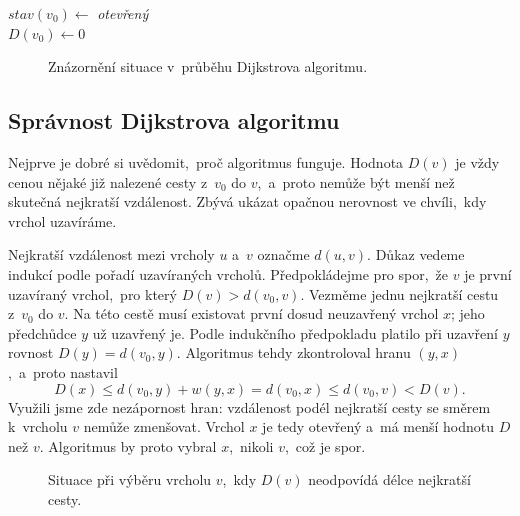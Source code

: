 \begin{algorithm}
    \caption{\textsc{Dijkstra}}
    $stav(v_0)\gets$ \textit{otevřený}\\
    $D(v_0)\gets 0$\\

\end{algorithm}
\begin{figure}[ht]
    \centering
    
    \caption{Znázornění situace v~průběhu Dijkstrova algoritmu.}
    \label{fig:dijkstra_kratsi_cesta}
\end{figure}

\subsection{Správnost Dijkstrova algoritmu}

Nejprve je dobré si uvědomit,~proč algoritmus funguje. Hodnota $D(v)$ je vždy cenou nějaké již nalezené cesty z~$v_0$ do $v$,~a~proto nemůže být menší než skutečná nejkratší vzdálenost. Zbývá ukázat opačnou nerovnost ve chvíli,~kdy vrchol uzavíráme.

Nejkratší vzdálenost mezi vrcholy $u$ a~$v$ označme $d(u,v)$. Důkaz vedeme indukcí podle pořadí uzavíraných vrcholů. Předpokládejme pro spor,~že $v$ je první uzavíraný vrchol,~pro který $D(v)>d(v_0,v)$. Vezměme jednu nejkratší cestu z~$v_0$ do $v$. Na této cestě musí existovat první dosud neuzavřený vrchol $x$; jeho předchůdce $y$ už uzavřený je. Podle indukčního předpokladu platilo při uzavření $y$ rovnost $D(y)=d(v_0,y)$. Algoritmus tehdy zkontroloval hranu $(y,x)$,~a~proto nastavil
\[D(x)\leqslant d(v_0,y)+w(y,x)=d(v_0,x)\leqslant d(v_0,v)<D(v).\]
Využili jsme zde nezápornost hran: vzdálenost podél nejkratší cesty se směrem k~vrcholu $v$ nemůže zmenšovat. Vrchol $x$ je tedy otevřený a~má menší hodnotu $D$ než $v$. Algoritmus by proto vybral $x$,~nikoli $v$,~což je spor.
\begin{figure}[ht]
    \centering
    
    \caption{Situace při výběru vrcholu $v$,~kdy $D(v)$ neodpovídá délce nejkratší cesty.}
    \label{fig:dijkstra_vyber_vrcholu}
\end{figure}

